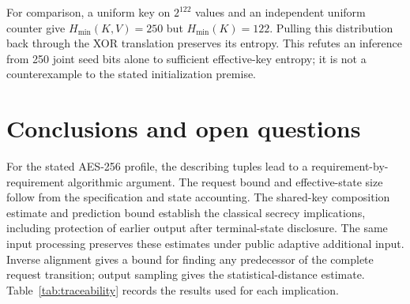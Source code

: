 \documentclass[journal=tosc,preprint,floatrow,nohyperxmp]{iacrtrans}
\newif\ifjordireview
\newcounter{jordinote}
\newcommand{\jordinote}[2]{%
  \ifjordireview
  \stepcounter{jordinote}\par\medskip\noindent
  \fcolorbox{blue!55!black}{blue!4}{%
    \begin{minipage}{\dimexpr\linewidth-2\fboxsep-2\fboxrule\relax}
    \small\raggedright\color{blue!45!black}
    \textbf{Solo Jordi -- J\thejordinote: #1}\par\smallskip
    #2
    \end{minipage}}\par\medskip
  \fi
}
\numberwithin{lemma}{section}
\numberwithin{proposition}{section}
\numberwithin{equation}{section}
\theoremstyle{definition}
\numberwithin{definition}{section}
\theoremstyle{plain}
\begin{document}
For comparison, a uniform key on $2^{122}$ values and an independent uniform counter give $H_{\min}(K,V)=250$ but $H_{\min}(K)=122$. Pulling this distribution back through the XOR translation preserves its entropy. This refutes an inference from 250 joint seed bits alone to sufficient effective-key entropy; it is not a counterexample to the stated initialization premise.

\jordinote{Entropía efectiva y alcance de la premisa}{La fuente suficiente se asume, pero sí hay que justificar qué hace el algoritmo con ella. Para uniform384, XOR da un estado uniforme y una clave uniforme256. El ejemplo de 250 bits conjuntos muestra por qué no basta contar entropía almacenada. Revisa que los umbrales generales 368/378 solo se usen para entropía inicial, no para extender silenciosamente toda la prueba de composición.}

\section{Conclusions and open questions}\label{sec:discussion}
For the stated AES-256 profile, the describing tuples lead to a requirement-by-requirement algorithmic argument. The request bound and effective-state size follow from the specification and state accounting. The shared-key composition estimate and prediction bound establish the classical secrecy implications, including protection of earlier output after terminal-state disclosure. The same input processing preserves these estimates under public adaptive additional input. Inverse alignment gives a bound for finding any predecessor of the complete request transition; output sampling gives the statistical-distance estimate. Table~\ref{tab:traceability} records the results used for each implication.

\jordinote{Cómo revisar el cierre requisito por requisito}{Comprueba esta tabla en ambos sentidos: cada requisito debe tener una definición y una justificación; cada resultado utilizado debe tener una hipótesis identificable. La comparación de rigor con Hash\_DRBG está en el registro de revisión, para no convertir el artículo en una discusión sobre cómo se ha redactado. Una conclusión condicional no puede perder sus condiciones al resumirse.}
\end{document}
